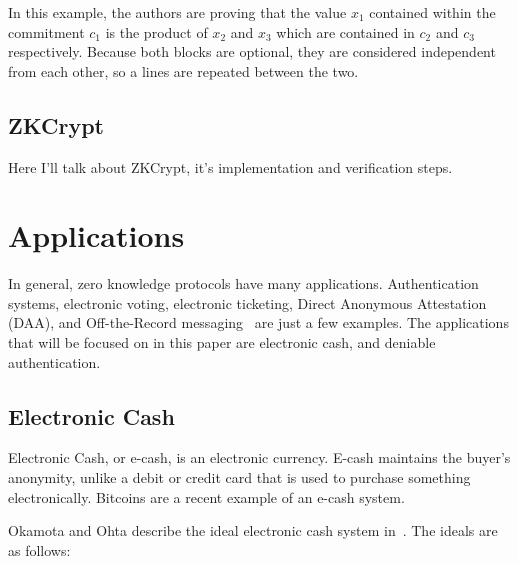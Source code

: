 \documentclass{sig-alternate}
\begin{document}
		In this example, the authors are proving that the value $x_{1}$ contained within
		the commitment $c_{1}$ is the product of $x_{2}$ and $x_{3}$ which are contained
		in $c_{2}$ and $c_{3}$ respectively. Because both blocks are optional, they are
		considered independent from each other, so a lines are repeated between the two.
		
	\subsection{ZKCrypt}
		Here I'll talk about ZKCrypt, it's implementation and verification steps.

\section{Applications}
	In general, zero knowledge protocols have many applications. Authentication systems,
	electronic voting, electronic ticketing, Direct Anonymous Attestation (DAA), and
	Off-the-Record messaging~\cite{ZKCrypt:2012, ZKPDL:2010} are just a few examples.
	The applications that will be focused on in this paper are electronic cash, and
	deniable authentication.
	
	\subsection{Electronic Cash}
	Electronic Cash, or e-cash, is an electronic currency. E-cash maintains the buyer's
	anonymity, unlike a debit or credit card that is used to purchase something 
	electronically. Bitcoins are a recent example of an e-cash system.
	
	Okamota and Ohta describe the ideal electronic cash system in~\cite{Ecash:1991}.
	The ideals are as follows:
	
\end{document}
